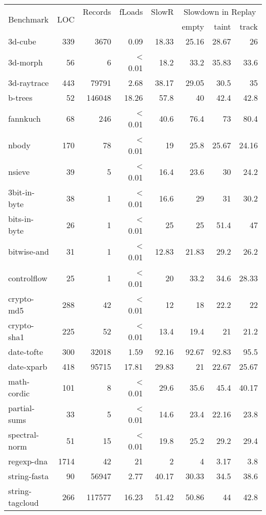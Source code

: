 \documentclass{sig-alternate}
\begin{document}
\begin{table*}
\begin{minipage}{0.6\textwidth}
{\scriptsize
\begin{center}
\begin{tabular}{|l|r|r|r|r|r|r|r|} \hline
\multirow{2}{*}{Benchmark} & \multirow{2}{*}{LOC} & \scriptsize{Records} & \scriptsize{fLoads}& \scriptsize{SlowR} &
\multicolumn{3}{|c|}{\scriptsize{ Slowdown in Replay}}\\
& & & & & empty & taint & track \\
\hline
3d-cube & 339 & 3670 & 0.09 & 18.33  & 25.16 & 28.67 & 26 \\
3d-morph& 56 & 6 & < 0.01 & 18.2 & 33.2 & 35.83 & 33.6 \\
3d-raytrace& 443 & 79791 & 2.68 & 38.17 & 29.05 & 30.5 & 35\\
b-trees& 52 & 146048 & 18.26 & 57.8 & 40 & 42.4 & 42.8\\
fannkuch& 68 & 246 & < 0.01 & 40.6 & 76.4 & 73 & 80.4 \\
nbody& 170 & 78 & < 0.01 & 19 & 25.8& 25.67 & 24.16\\
nsieve& 39 & 5 & < 0.01 & 16.4 & 23.6 & 30 & 24.2\\
3bit-in-byte& 38 & 1 & < 0.01& 16.6& 29 & 31 & 30.2 \\
bits-in-byte& 26 & 1 & < 0.01& 25 & 25 & 51.4 & 47 \\
bitwise-and& 31 & 1 & < 0.01& 12.83 & 21.83 & 29.2 & 26.2\\
controlflow& 25 & 1 & < 0.01& 20 & 33.2 & 34.6 & 28.33\\
crypto-md5& 288 & 42 & < 0.01& 12 & 18 & 22.2 & 22\\
crypto-sha1& 225 & 52 & < 0.01& 13.4& 19.4 & 21 & 21.2\\
date-tofte& 300 & 32018 & 1.59 & 92.16 & 92.67 & 92.83 & 95.5\\
date-xparb& 418 & 95715 & 17.81 & 29.83 & 21 & 22.67 & 25.67\\
math-cordic& 101 & 8 & < 0.01 & 29.6 & 35.6 & 45.4 & 40.17\\
partial-sums& 33 & 5 & < 0.01& 14.6 & 23.4 & 22.16& 23.8\\
spectral-norm& 51 & 15 & < 0.01& 19.8& 25.2 & 29.2 & 29.4\\
regexp-dna& 1714 & 42 & 21 & 2 & 4 & 3.17 & 3.8\\
string-fasta& 90 & 56947 & 2.77 & 40.17 & 30.33 & 34.5 & 38.6\\
string-tagcloud& 266 & 117577 & 16.23 & 51.42 & 50.86 & 44 & 42.8\\

\end{tabular}
\end{center}}
\end{minipage}
\end{table*}
\end{document}
